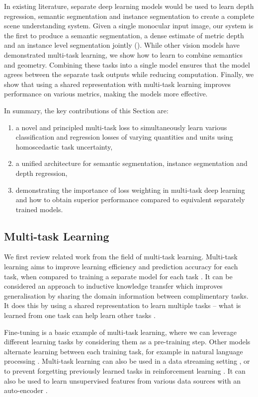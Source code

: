 In existing literature, separate deep learning models would be used to learn depth regression, semantic segmentation and instance segmentation to create a complete scene understanding system. Given a single monocular input image, our system is the first to produce a semantic segmentation, a dense estimate of metric depth and an instance level segmentation jointly (). While other vision models have demonstrated multi-task learning, we show how to learn to combine semantics and geometry. Combining these tasks into a single model ensures that the model agrees between the separate task outputs while reducing computation. Finally, we show that using a shared representation with multi-task learning improves performance on various metrics, making the models more effective.

In summary, the key contributions of this Section are:
\begin{enumerate}
\item a novel and principled multi-task loss to simultaneously learn various classification and regression losses of varying quantities and units using homoscedastic task uncertainty,
\item a unified architecture for semantic segmentation, instance segmentation and depth regression,
\item demonstrating the importance of loss weighting in multi-task deep learning and how to obtain superior performance compared to equivalent separately trained models.
\end{enumerate}



\subsection{Multi-task Learning}

We first review related work from the field of multi-task learning. Multi-task learning aims to improve learning efficiency and prediction accuracy for each task, when compared to training a separate model for each task \citep{thrun1996learning,baxter2000model}. It can be considered an approach to inductive knowledge transfer which improves generalisation by sharing the domain information between complimentary tasks. It does this by using a shared representation to learn multiple tasks -- what is learned from one task can help learn other tasks \citep{caruana1998multitask}.

Fine-tuning \citep{agrawal2015learning,oquab2014learning} is a basic example of multi-task learning, where we can leverage different learning tasks by considering them as a pre-training step.
Other models alternate learning between each training task, for example in natural language processing \citep{collobert2008unified}.
Multi-task learning can also be used in a data streaming setting \citep{thrun1996learning}, or to prevent forgetting previously learned tasks in reinforcement learning \citep{kirkpatrick2017overcoming}. It can also be used to learn unsupervised features from various data sources with an auto-encoder \citep{ngiam2011multimodal}.


